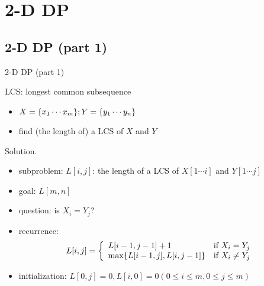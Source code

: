 \section{2-D DP}

\subsection{2-D DP (part 1)}
\begin{frame}{2-D DP (part 1)}
  \begin{exampleblock}{LCS: longest common subsequence }
    \begin{itemize}
      \item $X = \{x_{1} \cdots x_{m}\}; Y = \{y_{1} \cdots y_{n}\}$
      \item find (the length of) a LCS of $X$ and $Y$
    \end{itemize}
  \end{exampleblock}

  \begin{block}{Solution.}
    \begin{itemize}
      \item subproblem: $L[i,j]$: the length of a LCS of $X[1 \cdots i]$ and $Y[1 \cdots j]$
      \item goal: $L[m,n]$
      \item question: is $X_{i} = Y_{j}$?
      \item recurrence:
	\begin{displaymath}
	  L[i,j] = \left\{ \begin{array}{ll}
	    L[i-1, j-1] + 1 & \textrm{if $X_{i} = Y_{j}$}\\
	    \max \{L[i-1,j], L[i,j-1]\} & \textrm{if $X_{i} \neq Y_{j}$}
	  \end{array} \right.
	\end{displaymath}
      \item initialization: $L[0,j] = 0, L[i,0] = 0 (0 \le i \le m, 0 \le j \le m)$
    \end{itemize}
  \end{block}
\end{frame}
